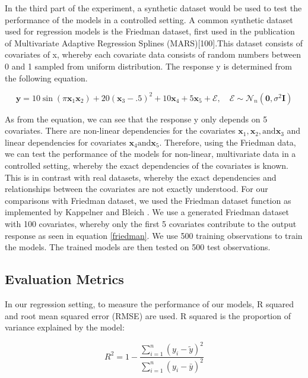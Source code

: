 \documentclass{usiinftr}
\begin{document}
In the third part of the experiment, a synthetic dataset would be used to test the performance of the models in a controlled setting. A common synthetic dataset used for regression models is the Friedman dataset, first used in the publication of Multivariate Adaptive Regression Splines (MARS)[100].This dataset consists of covariates of x, whereby each covariate data consists of random numbers between 0 and 1 sampled from uniform distribution. The response y is determined from the following equation.

\begin{equation}\label{friedman}
\boldsymbol{y}=10 \sin \left(\pi \boldsymbol{x}_{1} \boldsymbol{x}_{2}\right)+20\left(\boldsymbol{x}_{3}-.5\right)^{2}+10 \boldsymbol{x}_{4}+5 \boldsymbol{x}_{5}+\mathcal{E}, \quad \mathcal{E} \sim \mathcal{N}_{n}\left(\mathbf{0}, \sigma^{2} \boldsymbol{I}\right)
\end{equation}

As from the equation, we can see that the response y only depends on 5 covariates. There are non-linear dependencies for the covariates $\boldsymbol{x}_{1}, \boldsymbol{x}_{2}, \text{
and} \boldsymbol{x}_{3}$ and linear dependencies for covariates $\boldsymbol{x}_{4} \text{
and} \boldsymbol{x}_{5}$. Therefore, using the Friedman data, we can test the performance of the models for non-linear, multivariate data in a controlled setting, whereby the exact dependencies of the covariates is known. This is in contrast with real datasets, whereby the exact dependencies and relationships between the covariates are not exactly understood. For our comparisons with Friedman dataset, we used the Friedman dataset function as implemented by Kappelner and Bleich \cite{}. We use a generated Friedman dataset with 100 covariates, whereby only the first 5 covariates contribute to the output response as seen in equation \ref{friedman}. We use 500 training observations to train the models. The trained models are then tested on 500 test observations.

\subsection{Evaluation Metrics}
In our regression setting, to measure the performance of our models, R squared and root mean squared error (RMSE) are used. R squared is the proportion of variance explained by the model: 

\begin{equation}
R^{2}=1-\frac{\sum_{i=1}^{n}\left(y_{i}-\tilde{y}\right)^{2}}{\sum_{i=1}^{n}\left(y_{i}-\bar{y}\right)^{2}}
\end{equation}
\end{document}
